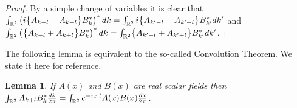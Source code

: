 \documentclass[iop,revtex4,apj,onecolumn]{emulateapj}
\newtheorem{lemma}{Lemma}
\begin{document}
\begin{proof}
By a simple change of variables it is clear that 
$\int_{\Bbb R^2} \left(i\bigl\{ A_{k-l}  -   A_{k+l}  \bigr\} B^*_k\right)^* dk = \int_{\Bbb R^2} i\bigl\{ A_{k^\prime-l} - A_{k^\prime+l}  \bigr\} B_{k^\prime}^* dk^\prime$ and $\int_{\Bbb R^2} \left(\bigl\{  A_{k-l}  +    A_{k+l}   \bigr\} B^*_k \right)^* dk  = \int_{\Bbb R^2} \bigl\{ A_{k^\prime-l} + A_{k^\prime+l}  \bigr\} B_{k^\prime}^* dk^\prime$.


\end{proof}



The following lemma is equivalent to the so-called Convolution Theorem. We state it here for reference.
\begin{lemma} 
\label{conv}
If $A(x)$ and $B(x)$ are real scalar fields then  $\int_{\Bbb R^2} A_{k+l}  B^*_k \frac{dk}{2\pi}= \int_{\Bbb R^2} e^{-ix\cdot l} A(x)B(x)\frac{dx}{2\pi}$.
\end{lemma}

\end{document}
